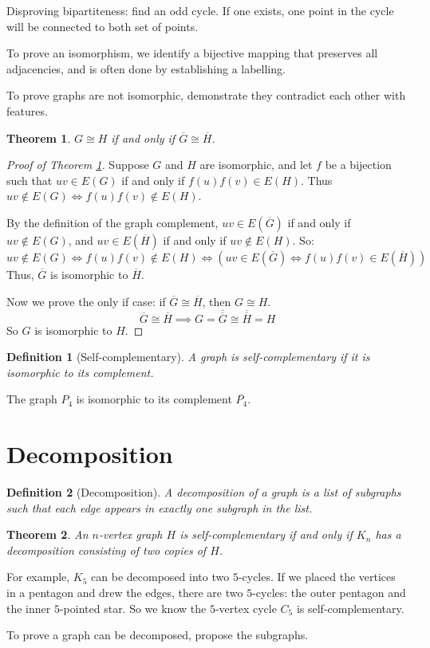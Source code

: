 \documentclass{article}
\newtheorem{thm}{Theorem}[section]
\newtheorem{defn}{Definition}[section]
\begin{document}
Disproving bipartiteness: find an odd cycle. If one exists, one point in the cycle will be connected to both set of points.

To prove an isomorphism, we identify a bijective mapping that preserves all adjacencies, and is often done by establishing a labelling.

To prove graphs are not isomorphic, demonstrate they contradict each other with features.

\begin{thm} \label{thm:isomorphiccomplement}
	$G\cong H$ if and only if $\overline G \cong \overline H$.
\end{thm}

\begin{proof}[Proof of Theorem \ref{thm:isomorphiccomplement}]
	Suppose $G$ and $H$ are isomorphic, and let $f$ be a bijection such that $uv\in E(G)$ if and only if $f(u)f(v)\in E(H)$. Thus $uv\not\in E(G) \iff f(u)f(v)\not\in E(H)$.

	By the definition of the graph complement, $uv\in E(\overline G)$ if and only if $uv\not\in E(G)$, and $uv\in E(\overline H)$ if and only if $uv\not\in E(H)$. So:
	\begin{equation*}
		uv\not\in E(G)
		\iff f(u)f(v)\not\in E(H)
		\iff (uv\in E(\overline G)
		\iff f(u)f(v)\in E(\overline H))
	\end{equation*}
	Thus, $\overline G$ is isomorphic to $\overline H$.

	Now we prove the only if case: if $\overline G\cong \overline H$, then $G\cong H$.
	\begin{equation*}
		\overline G\cong \overline H
		\implies G=\overline{\overline G}\cong \overline{\overline H}=H
	\end{equation*}
	So $G$ is isomorphic to $H$.
\end{proof}

\begin{defn}[Self-complementary]
	A graph is self-complementary if it is isomorphic to its complement. 
\end{defn}
The graph $P_4$ is isomorphic to its complement $\overline{P_4}$.

\section{Decomposition}
\begin{defn}[Decomposition]
	A decomposition of a graph is a list of subgraphs such that each edge appears in exactly one subgraph in the list.
\end{defn}

\begin{thm}
	An $n$-vertex graph $H$ is self-complementary if and only if $K_n$ has a decomposition consisting of two copies of $H$.
\end{thm}

For example, $K_5$ can be decomposed into two $5$-cycles. If we placed the vertices in a pentagon and drew the edges, there are two $5$-cycles: the outer pentagon and the inner $5$-pointed star. So we know the $5$-vertex cycle $C_5$ is self-complementary.

To prove a graph can be decomposed, propose the subgraphs.
\end{document}
